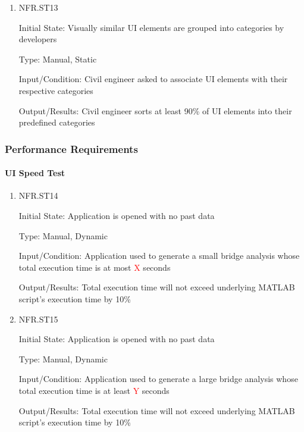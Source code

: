 \documentclass[12pt, titlepage]{article}
\begin{document}
\begin{enumerate}

\item{NFR.ST13\\}

Initial State: Visually similar UI elements are grouped into categories by developers

Type: Manual, Static

Input/Condition: Civil engineer asked to associate UI elements with their respective categories

Output/Results: Civil engineer sorts at least 90\% of UI elements into their predefined categories

\end{enumerate}

\subsubsection{Performance Requirements}

\paragraph{UI Speed Test}

\begin{enumerate}

\item{NFR.ST14\\}

Initial State: Application is opened with no past data

Type: Manual, Dynamic

Input/Condition: Application used to generate a small bridge analysis whose total execution time is at most \textcolor{red}{X} seconds

Output/Results: Total execution time will not exceed underlying MATLAB script's execution time by 10\%

\item{NFR.ST15\\}

Initial State: Application is opened with no past data

Type: Manual, Dynamic

Input/Condition: Application used to generate a large bridge analysis whose total execution time is at least \textcolor{red}{Y} seconds

Output/Results: Total execution time will not exceed underlying MATLAB script's execution time by 10\%

\end{enumerate}
\end{document}

